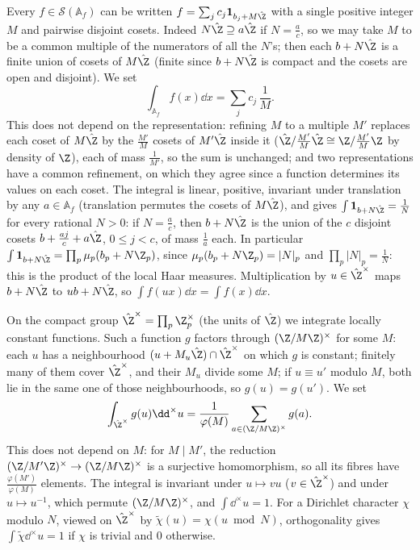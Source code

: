 Every $f\in\mathcal S(\mathbb{A}_f)$ can be written $f=\sum_jc_j\mathbf 1_{b_j+M\hat{\Z}}$ with a single positive integer $M$ and pairwise disjoint
cosets. Indeed $N\hat{\Z}\supseteq a\hat{\Z}$ if $N=\frac ac$, so we may take $M$ to be a common multiple of the numerators of all the $N$'s;
then each $b+N\hat{\Z}$ is a finite union of cosets of $M\hat{\Z}$ (finite since $b+N\hat{\Z}$ is compact and the cosets are open and
disjoint). We set
\[
\int_{\mathbb{A}_f}f(x)\dd x=\sum_jc_j\,\frac1M.
\]
This does not depend on the representation: refining $M$ to a multiple $M'$ replaces each coset of $M\hat{\Z}$ by the $\frac{M'}M$ cosets of
$M'\hat{\Z}$ inside it ($\hat{\Z}/\frac{M'}M\hat{\Z}\cong\Z/\frac{M'}M\Z$ by density of $\Z$), each of mass $\frac1{M'}$, so the sum is unchanged; and two
representations have a common refinement, on which they agree since a function determines its values on each coset. The integral is
linear, positive, invariant under translation by any $a\in\mathbb{A}_f$ (translation permutes the cosets of $M\hat{\Z}$), and gives
$\int\mathbf 1_{b+N\hat{\Z}}=\frac1N$ for every rational $N>0$: if $N=\frac ac$, then $b+N\hat{\Z}$ is the union of the $c$ disjoint cosets
$b+\frac{aj}c+a\hat{\Z}$, $0\le j<c$, of mass $\frac1a$ each. In particular $\int\mathbf 1_{b+N\hat{\Z}}=\prod_p\mu_p(b_p+N\Z_p)$, since
$\mu_p(b_p+N\Z_p)=|N|_p$ and $\prod_p|N|_p=\frac1N$: this is the product of the local Haar measures. Multiplication by
$u\in\hat{\Z}^\times$ maps $b+N\hat{\Z}$ to $ub+N\hat{\Z}$, so $\int f(ux)\dd x=\int f(x)\dd x$.

On the compact group $\hat{\Z}^\times=\prod_p\Z_p^\times$ (the units of $\hat{\Z}$) we integrate locally constant functions. Such a function
$g$ factors through $(\Z/M\Z)^\times$ for some $M$: each $u$ has a neighbourhood $(u+M_u\hat{\Z})\cap\hat{\Z}^\times$ on which $g$ is constant;
finitely many of them cover $\hat{\Z}^\times$, and their $M_u$ divide some $M$; if $u\equiv u'$ modulo $M$, both lie in the same one of those
neighbourhoods, so $g(u)=g(u')$. We set
\[
\int_{\hat{\Z}^\times}g(u)\dd^\times u=\frac1{\varphi(M)}\sum_{a\in(\Z/M\Z)^\times}g(a).
\]
This does not depend on $M$: for $M\mid M'$, the reduction $(\Z/M'\Z)^\times\to(\Z/M\Z)^\times$ is a surjective homomorphism, so all its fibres
have $\frac{\varphi(M')}{\varphi(M)}$ elements. The integral is invariant under $u\mapsto vu$ ($v\in\hat{\Z}^\times$) and under $u\mapsto u^{-1}$,
which permute $(\Z/M\Z)^\times$, and $\int\dd^\times u=1$. For a Dirichlet character $\chi$ modulo $N$, viewed on $\hat{\Z}^\times$ by
$\tilde\chi(u)=\chi(u\bmod N)$, orthogonality gives $\int\tilde\chi\dd^\times u=1$ if $\chi$ is trivial and $0$ otherwise.

